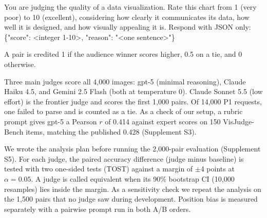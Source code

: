 \documentclass{vgtc}
\begin{document}
\smallskip
\noindent\colorbox{promptbg}{\parbox{\dimexpr\columnwidth-2\fboxsep\relax}{\scriptsize\ttfamily You are judging the quality of a data visualization. Rate this chart from 1 (very poor) to 10 (excellent), considering how clearly it communicates its data, how well it is designed, and how visually appealing it is. Respond with JSON only: \{"score": <integer 1-10>, "reason": "<one sentence>"\}}}
\smallskip

\noindent A pair is credited 1 if the audience winner scores higher, 0.5 on a tie, and 0 otherwise.

Three main judges score all 4{,}000 images: gpt-5 (minimal reasoning), Claude Haiku 4.5, and Gemini 2.5 Flash (both at temperature 0). Claude Sonnet 5.5 (low effort) is the frontier judge and scores the first 1{,}000 pairs. Of 14{,}000 P1 requests, one failed to parse and is counted as a tie. As a check of our setup, a rubric prompt gives gpt-5 a Pearson $r$ of 0.414 against expert scores on 150 VisJudge-Bench items, matching the published 0.428 (Supplement S3).

We wrote the analysis plan before running the 2{,}000-pair evaluation (Supplement S5). For each judge, the paired accuracy difference (judge minus baseline) is tested with two one-sided tests (TOST) against a margin of $\pm$4 points at $\alpha=0.05$. A judge is called equivalent when its 90\% bootstrap CI (10{,}000 resamples) lies inside the margin. As a sensitivity check we repeat the analysis on the 1{,}500 pairs that no judge saw during development. Position bias is measured separately with a pairwise prompt run in both A/B orders.
\end{document}

